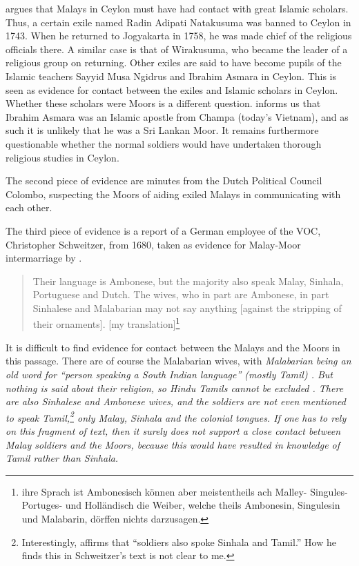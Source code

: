 \citet[43]{Hussainmiya1990} argues that Malays in Ceylon must have had contact with great Islamic scholars. Thus, a certain exile named Radin Adipati Natakusuma was banned to Ceylon in 1743. When he returned to Jogyakarta in 1758, he was made chief of the religious officials there. A similar case is that of Wirakusuma, who became the leader of a religious group on returning. Other exiles are said to have become
pupils of the Islamic teachers Sayyid Musa Ngidrus and Ibrahim Asmara in Ceylon. This is seen as evidence for contact between the
exiles and Islamic scholars in Ceylon.  Whether these scholars were Moors is a different question. \citet{Wieringa1997} informs us that Ibrahim Asmara was an Islamic apostle from Champa (today's Vietnam), and as such it is unlikely that he was a Sri Lankan Moor.  It remains furthermore
questionable whether the normal soldiers would have undertaken thorough religious studies in Ceylon.

The second piece of evidence are minutes from the Dutch Political Council Colombo, suspecting the Moors of aiding exiled Malays in communicating with each other.

The third piece of evidence is a report of a German employee of the \textsc{VOC}, Christopher Schweitzer, from 1680, taken as evidence for Malay-Moor intermarriage by \citet{SmithEtAl2006cll}.

\begin{quote}
    Their language is Ambonese, but the majority also speak Malay, Sinhala, Portuguese and Dutch. \el{} The wives, who in part are Ambonese, in part Sinhalese and Malabarian may not say anything [against the stripping of their ornaments]. \citep[106]{Schweitzer1931} [my translation]\footnote{\el ihre Sprach ist Ambonesisch können aber meistentheils ach Malley- Singules- Portuges- und Holländisch \el die Weiber, welche theils Ambonesin, Singulesin und Malabarin, dörffen nichts darzusagen.}
\end{quote}
 


It is difficult to find evidence for contact between the Malays
and the Moors in this passage. There are of course the Malabarian
wives, with \em Malabarian \em being an old word for  ``person speaking a South Indian language'' (mostly Tamil) \citep[cf.][92]{Rogers1990}.
But nothing is said about their religion, so Hindu Tamils cannot be excluded \citep[cf.][68]{Hussainmiya1987}. There are also Sinhalese and Ambonese wives, and the soldiers are not even mentioned to speak Tamil,\footnote{Interestingly,
 \citet[45]{Hussainmiya1990} affirms that ``soldiers also spoke Sinhala and Tamil.'' How he finds this in Schweitzer's text is not clear to me.}
only Malay, Sinhala and the colonial tongues. If one has to rely on this fragment of text, then it surely does not support a close contact between Malay soldiers and the Moors, because this would have resulted in knowledge of Tamil rather than Sinhala.

